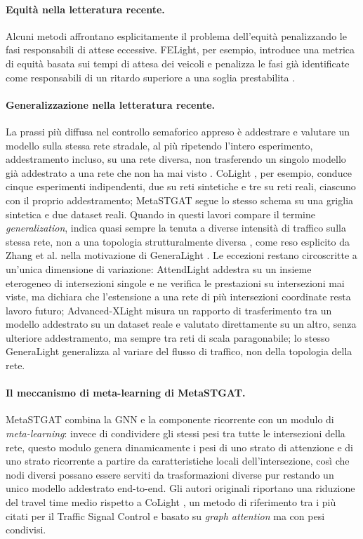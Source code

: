 \paragraph{Equità nella letteratura recente.} Alcuni metodi affrontano
esplicitamente il problema dell'equità penalizzando le fasi responsabili
di attese eccessive. FELight, per esempio, introduce una metrica di
equità basata sui tempi di attesa dei veicoli e penalizza le fasi già
identificate come responsabili di un ritardo superiore a una soglia
prestabilita \citep{xiao2025tscreview}.

\paragraph{Generalizzazione nella letteratura recente.} La prassi più
diffusa nel controllo semaforico appreso è addestrare e valutare un
modello sulla stessa rete stradale, al più ripetendo l'intero
esperimento, addestramento incluso, su una rete diversa, non trasferendo
un singolo modello già addestrato a una rete che non ha mai visto
\citep{wei2020tscsurvey}. CoLight \citep{wei2019colight}, per esempio,
conduce cinque esperimenti indipendenti, due su reti sintetiche e tre su
reti reali, ciascuno con il proprio addestramento; MetaSTGAT
\citep{wang2022metastgat} segue lo stesso schema su una griglia sintetica
e due dataset reali. Quando in questi lavori compare il termine
\emph{generalization}, indica quasi sempre la tenuta a diverse intensità
di traffico sulla stessa rete, non a una topologia strutturalmente
diversa \citep{wang2026astgcndrl, sun2026tgmaddpg}, come reso esplicito
da Zhang et al. nella motivazione di GeneraLight
\citep{zhang2020generalight}. Le eccezioni restano circoscritte a
un'unica dimensione di variazione: AttendLight
\citep{oroojlooy2020attendlight} addestra su un insieme eterogeneo di
intersezioni singole e ne verifica le prestazioni su intersezioni mai
viste, ma dichiara che l'estensione a una rete di più intersezioni
coordinate resta lavoro futuro; Advanced-XLight
\citep{zhang2022advancedxlight} misura un rapporto di trasferimento tra
un modello addestrato su un dataset reale e valutato direttamente su un
altro, senza ulteriore addestramento, ma sempre tra reti di scala
paragonabile; lo stesso GeneraLight generalizza al variare del flusso di
traffico, non della topologia della rete.

\paragraph{Il meccanismo di meta-learning di MetaSTGAT.} MetaSTGAT
\citep{wang2022metastgat} combina la GNN e la componente ricorrente con
un modulo di \emph{meta-learning}: invece di condividere gli stessi pesi
tra tutte le intersezioni della rete, questo modulo genera dinamicamente
i pesi di uno strato di attenzione e di uno strato ricorrente a partire
da caratteristiche locali dell'intersezione, così che nodi diversi
possano essere serviti da trasformazioni diverse pur restando un unico
modello addestrato end-to-end. Gli autori originali riportano una
riduzione del travel time medio rispetto a CoLight \citep{wei2019colight},
un metodo di riferimento tra i più citati per il Traffic Signal Control e
basato su \emph{graph attention} ma con pesi condivisi.

